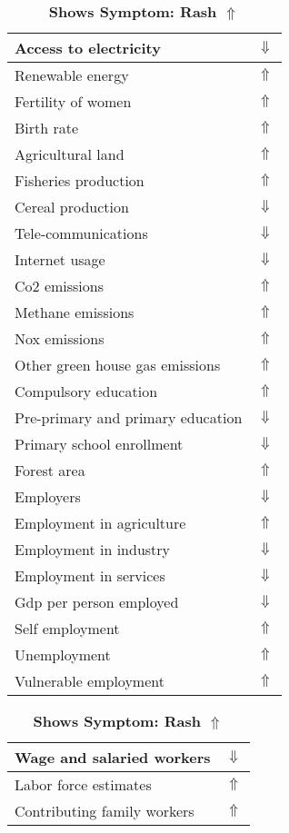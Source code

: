\documentclass[12pt,notitlepage,oneside]{report}
\begin{document}
\begin{table}[!htb]
\caption{\textbf{Shows Symptom: Rash $\Uparrow$}}
\centering
\label{Correlated Socio-economic Factors0}
\begin{tabular}{|l|l|}
\hline
Access to electricity & $\Downarrow$\\ \hline
Renewable energy & $\Uparrow$\\ \hline
Fertility of women & $\Uparrow$\\ \hline
Birth rate & $\Uparrow$\\ \hline
Agricultural land & $\Uparrow$\\ \hline
Fisheries production & $\Uparrow$\\ \hline
Cereal production & $\Downarrow$\\ \hline
Tele-communications & $\Downarrow$\\ \hline
Internet usage & $\Downarrow$\\ \hline
Co2 emissions & $\Uparrow$\\ \hline
Methane emissions & $\Uparrow$\\ \hline
Nox emissions & $\Uparrow$\\ \hline
Other green house gas emissions & $\Uparrow$\\ \hline
Compulsory education & $\Uparrow$\\ \hline
Pre-primary and primary education & $\Downarrow$\\ \hline
Primary school enrollment & $\Downarrow$\\ \hline
Forest area & $\Uparrow$\\ \hline
Employers & $\Downarrow$\\ \hline
Employment in agriculture & $\Uparrow$\\ \hline
Employment in industry & $\Downarrow$\\ \hline
Employment in services & $\Downarrow$\\ \hline
Gdp per person employed & $\Downarrow$\\ \hline
Self employment & $\Uparrow$\\ \hline
Unemployment & $\Uparrow$\\ \hline
Vulnerable employment & $\Uparrow$\\ \hline
\end{tabular}
\begin{tabular}{|l|l|}
\hline
Wage and salaried workers & $\Downarrow$\\ \hline
Labor force estimates & $\Uparrow$\\ \hline
Contributing family workers & $\Uparrow$\\ \hline

\end{tabular}
\end{table}
\end{document}
